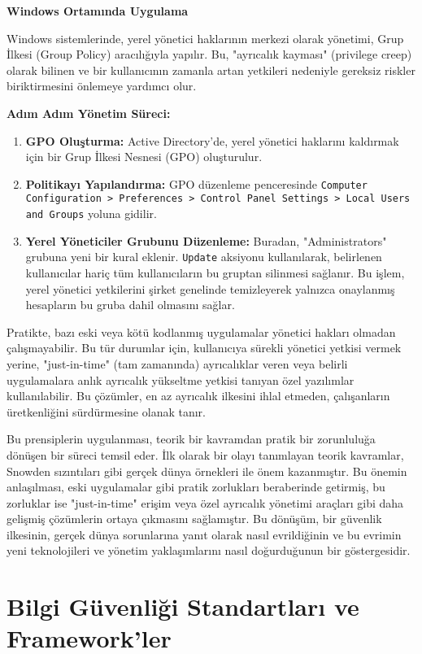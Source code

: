 \textbf{Windows Ortamında Uygulama}

Windows sistemlerinde, yerel yönetici haklarının merkezi olarak yönetimi, Grup İlkesi (Group Policy) aracılığıyla yapılır. Bu, "ayrıcalık kayması" (privilege creep) olarak bilinen ve bir kullanıcının zamanla artan yetkileri nedeniyle gereksiz riskler biriktirmesini önlemeye yardımcı olur.

\textbf{Adım Adım Yönetim Süreci:}

\begin{enumerate}
    \item \textbf{GPO Oluşturma:} Active Directory'de, yerel yönetici haklarını kaldırmak için bir Grup İlkesi Nesnesi (GPO) oluşturulur.
    \item \textbf{Politikayı Yapılandırma:} GPO düzenleme penceresinde \texttt{Computer Configuration > Preferences > Control Panel Settings > Local Users and Groups} yoluna gidilir.
    \item \textbf{Yerel Yöneticiler Grubunu Düzenleme:} Buradan, "Administrators" grubuna yeni bir kural eklenir. \texttt{Update} aksiyonu kullanılarak, belirlenen kullanıcılar hariç tüm kullanıcıların bu gruptan silinmesi sağlanır. Bu işlem, yerel yönetici yetkilerini şirket genelinde temizleyerek yalnızca onaylanmış hesapların bu gruba dahil olmasını sağlar.
\end{enumerate}

Pratikte, bazı eski veya kötü kodlanmış uygulamalar yönetici hakları olmadan çalışmayabilir. Bu tür durumlar için, kullanıcıya sürekli yönetici yetkisi vermek yerine, "just-in-time" (tam zamanında) ayrıcalıklar veren veya belirli uygulamalara anlık ayrıcalık yükseltme yetkisi tanıyan özel yazılımlar kullanılabilir. Bu çözümler, en az ayrıcalık ilkesini ihlal etmeden, çalışanların üretkenliğini sürdürmesine olanak tanır.

Bu prensiplerin uygulanması, teorik bir kavramdan pratik bir zorunluluğa dönüşen bir süreci temsil eder. İlk olarak bir olayı tanımlayan teorik kavramlar, Snowden sızıntıları gibi gerçek dünya örnekleri ile önem kazanmıştır. Bu önemin anlaşılması, eski uygulamalar gibi pratik zorlukları beraberinde getirmiş, bu zorluklar ise "just-in-time" erişim veya özel ayrıcalık yönetimi araçları gibi daha gelişmiş çözümlerin ortaya çıkmasını sağlamıştır. Bu dönüşüm, bir güvenlik ilkesinin, gerçek dünya sorunlarına yanıt olarak nasıl evrildiğinin ve bu evrimin yeni teknolojileri ve yönetim yaklaşımlarını nasıl doğurduğunun bir göstergesidir.

\section{Bilgi Güvenliği Standartları ve Framework'ler}

